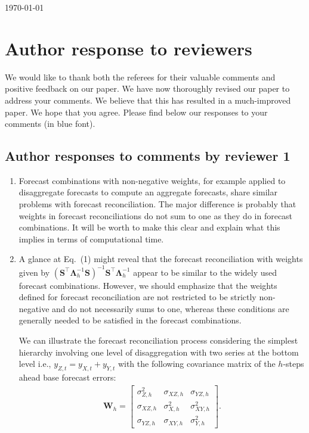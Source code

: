 \documentclass[10pt,a4paper]{article}
\begin{document}
\today
\section*{Author response to reviewers}
We would like to thank both the referees for their valuable comments and positive feedback on our paper. We have now thoroughly revised our paper to address your comments. We believe that this has resulted in a much-improved paper. We hope that you agree. Please find below our responses to your comments (in {\color{blue} blue} font). 

\subsection*{Author responses to comments by reviewer 1}
\begin{enumerate}
	\item Forecast combinations with non-negative weights, for example applied to disaggregate forecasts to compute an aggregate forecasts, share similar problems with forecast reconciliation. The major difference is probably that weights in forecast reconciliations do not sum to one as they do in forecast combinations. It will be worth to make this clear and {\color{red} explain what this implies in terms of computational time.} 
	\item [] {\color{blue} A glance at Eq.~(1) might reveal that the forecast reconciliation with weights given by $(\bm{S}^\top\bm{\Lambda}^{-1}_h\bm{S})^{-1}\bm{S}^\top\bm{\Lambda}_h^{-1}$ appear to be similar to the widely used forecast combinations. However, we should emphasize that the weights defined for forecast reconciliation are not restricted to be strictly non-negative and do not necessarily sums to one, whereas these conditions are generally needed to be satisfied in the forecast combinations.
	
	We can illustrate the forecast reconciliation process considering the simplest hierarchy involving one level of disaggregation with two series at the bottom level i.e., $y_{Z, t} = y_{X, t} + y_{Y, t}$ with the following covariance matrix of the $h$-steps ahead base forecast errors:
	\begin{align*}
	\bm{W}_h = \begin{bmatrix}
	\sigma^2_{Z, h} & \sigma_{XZ, h} & \sigma_{YZ, h}\\
	\sigma_{XZ, h} & \sigma^2_{X, h} & \sigma^2_{XY, h}\\
	\sigma_{YZ, h} & \sigma_{XY, h} & \sigma^2_{Y, h}
	\end{bmatrix}.
	\end{align*}
	

}
\end{enumerate}
\end{document}
